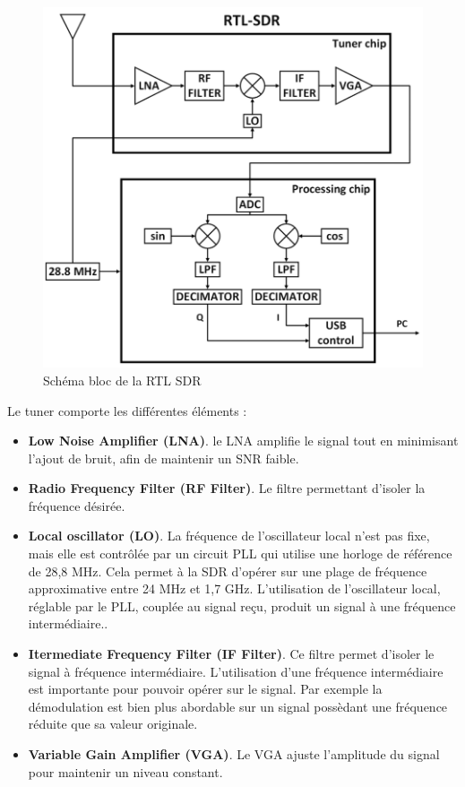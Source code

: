 \newpage

\begin{figure}[h]
\centering

\includegraphics[scale=0.5]{images/SB-rtlsdr.png}
\caption{Schéma bloc de la RTL SDR\cite{SBrtlsdr}}\label{term3000}
\end{figure}


Le tuner comporte les différentes éléments :
\begin{itemize}
\item \textbf{Low Noise Amplifier (LNA)}. le LNA amplifie le signal tout en minimisant l'ajout de bruit, afin de maintenir un SNR faible.
\item \textbf{Radio Frequency Filter (RF Filter)}. Le filtre permettant d'isoler la fréquence désirée.
\item \textbf{Local oscillator (LO)}. La fréquence de l'oscillateur local n'est pas fixe, mais elle est contrôlée par un circuit PLL qui utilise une horloge de référence de 28,8 MHz. Cela permet à la SDR d'opérer sur une plage de fréquence approximative entre 24 MHz et 1,7 GHz. L'utilisation de l'oscillateur local, réglable par le PLL, couplée au signal reçu, produit un signal à une fréquence intermédiaire..
\item \textbf{Itermediate Frequency Filter (IF Filter)}. Ce filtre permet d'isoler le signal à fréquence intermédiaire. L'utilisation d'une fréquence intermédiaire est importante pour pouvoir opérer sur le signal. Par exemple la démodulation est bien plus abordable sur un signal possèdant une fréquence réduite que sa valeur originale.
\item \textbf{Variable Gain Amplifier (VGA)}. Le VGA ajuste l'amplitude du signal pour maintenir un niveau constant.
\end{itemize}

